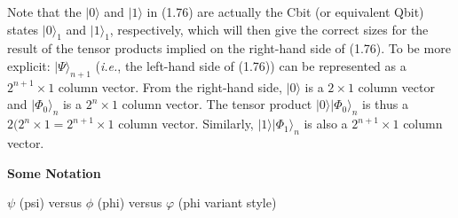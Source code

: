\documentclass{article}
\begin{document}
\vspace{0.125in}

Note that the $|0\rangle$ and $|1\rangle$ in (1.76) are actually the Cbit (or equivalent Qbit) states $|0\rangle_1$ and $|1\rangle_1$, respectively, which will then give the correct sizes for the result of the tensor products implied on the right-hand side of (1.76). To be more explicit: $|\Psi\rangle_{n+1}$ (\textit{i.e.}, the left-hand side of (1.76)) can be represented as a $2^{n+1}\times 1$ column vector. From the right-hand side, $|0\rangle$ is a $2\times 1$ column vector and $|\Phi_0\rangle_{n}$ is a $2^n \times 1$ column vector. The tensor product $|0\rangle |\Phi_0\rangle_{n}$ is thus a $2(2^n\times 1 = 2^{n+1}\times 1$ column vector. Similarly, $|1\rangle |\Phi_1\rangle_{n}$ is also a $2^{n+1}\times 1$ column vector.

\vspace{0.25in}

\textbf{\large Some Notation}\par

$\psi$ (psi) versus $\phi$ (phi) versus $\varphi$ (phi variant style)



\printbibliography
\end{document}
